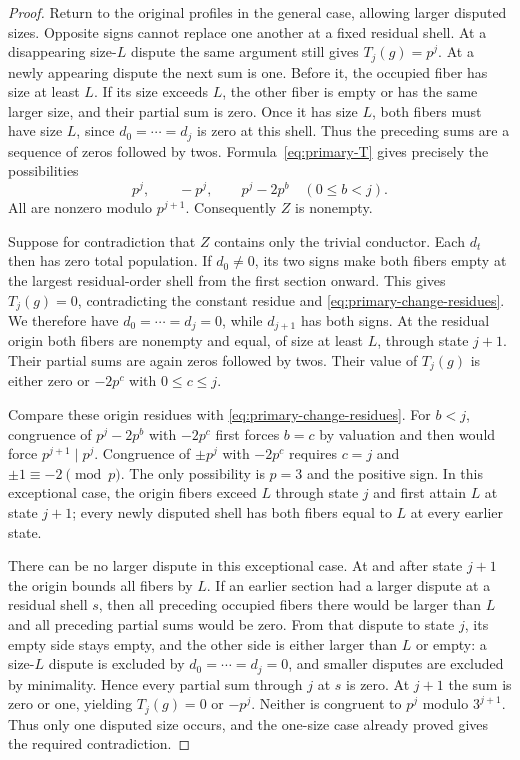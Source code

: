 \documentclass[11pt]{article}
\numberwithin{equation}{section}
\theoremstyle{definition}
\theoremstyle{remark}
\begin{document}
\begin{proof}
Return to the original profiles in the general case, allowing larger
disputed sizes.
Opposite signs cannot replace one another at a fixed residual shell.
At a disappearing size-\(L\) dispute the same argument still gives
\(T_j(g)=p^j\). At a newly appearing dispute the next sum is one.
Before it, the occupied fiber has size at least \(L\). If its size
exceeds \(L\), the other fiber is empty or has the same larger size,
and their partial sum is zero. Once it has size \(L\), both fibers
must have size \(L\), since \(d_0=\cdots=d_j\) is zero at this
shell. Thus the preceding sums are a sequence of zeros followed by
twos. Formula~\eqref{eq:primary-T} gives precisely the possibilities
\begin{equation}
p^j,\qquad -p^j,\qquad p^j-2p^b\quad(0\le b<j).
\label{eq:primary-change-residues}
\end{equation}
All are nonzero modulo \(p^{j+1}\). Consequently \(Z\) is nonempty.

Suppose for contradiction that \(Z\) contains only the trivial
conductor. Each \(d_t\) then has zero total population. If
\(d_0\ne0\), its two signs make both fibers empty at the largest
residual-order shell from the first section onward. This gives
\(T_j(g)=0\), contradicting the constant residue and
\eqref{eq:primary-change-residues}. We therefore have
\(d_0=\cdots=d_j=0\), while \(d_{j+1}\) has both signs.
At the residual origin both fibers are nonempty and equal, of size at
least \(L\), through state \(j+1\). Their partial sums are again
zeros followed by twos. Their value of \(T_j(g)\) is either zero
or \(-2p^c\) with \(0\le c\le j\).

Compare these origin residues with \eqref{eq:primary-change-residues}.
For \(b<j\), congruence of \(p^j-2p^b\) with \(-2p^c\)
first forces \(b=c\) by valuation and then would force
\(p^{j+1}\mid p^j\). Congruence of \(\pm p^j\) with
\(-2p^c\) requires \(c=j\) and \(\pm1\equiv-2\pmod p\).
The only possibility is \(p=3\) and the positive sign.
In this exceptional case, the origin fibers exceed \(L\) through
state \(j\) and first attain \(L\) at state \(j+1\); every newly
disputed shell has both fibers equal to \(L\) at every earlier state.

There can be no larger dispute in this exceptional case. At and after
state \(j+1\) the origin bounds all fibers by \(L\). If an earlier
section had a larger dispute at a residual shell \(s\), then all
preceding occupied fibers there would be larger than \(L\) and all
preceding partial sums would be zero. From that dispute to state
\(j\), its empty side stays empty, and the other side is either
larger than \(L\) or empty: a size-\(L\) dispute is excluded by
\(d_0=\cdots=d_j=0\), and smaller disputes are excluded by minimality.
Hence every partial sum through \(j\) at \(s\) is zero. At
\(j+1\) the sum is zero or one, yielding \(T_j(g)=0\) or
\(-p^j\). Neither is congruent to \(p^j\) modulo \(3^{j+1}\).
Thus only one disputed size occurs, and the one-size case already
proved gives the required contradiction.
\end{proof}
\end{document}
